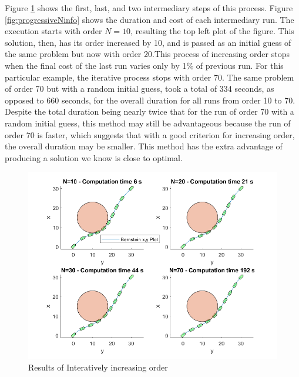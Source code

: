 \par Figure \ref{fig:progressiveNexamples} shows the first, last, and two intermediary steps of this process. Figure \ref{fig:progressiveNinfo} shows the duration and cost of each intermediary run. The execution starts with order $N=10$, resulting the top left plot of the figure. This solution, then, has its order increased by 10, and is passed as an initial guess of the same problem but now with order 20.This process of increasing order stops when the final cost of the last run varies only by 1\% of previous run. For this particular example, the iterative process stops with order 70. The same problem of order 70 but with a random initial guess, took a total of 334 seconds, as opposed to 660 seconds, for the overall duration for all runs from order 10 to 70. Despite the total duration being nearly twice that for the run of order 70 with a random initial guess, this method may still be advantageous because the run of order 70 is faster, which suggests that with a good criterion for increasing order, the overall duration may be smaller. This method has the extra advantage of producing a solution we know is close to optimal. 



\begin{figure}[h!]
\centering
\includegraphics[width=\textwidth]{Images/results/progressiveNexamples.png}
\caption{Results of Interatively increasing order}
\label{fig:progressiveNexamples}
\end{figure}


